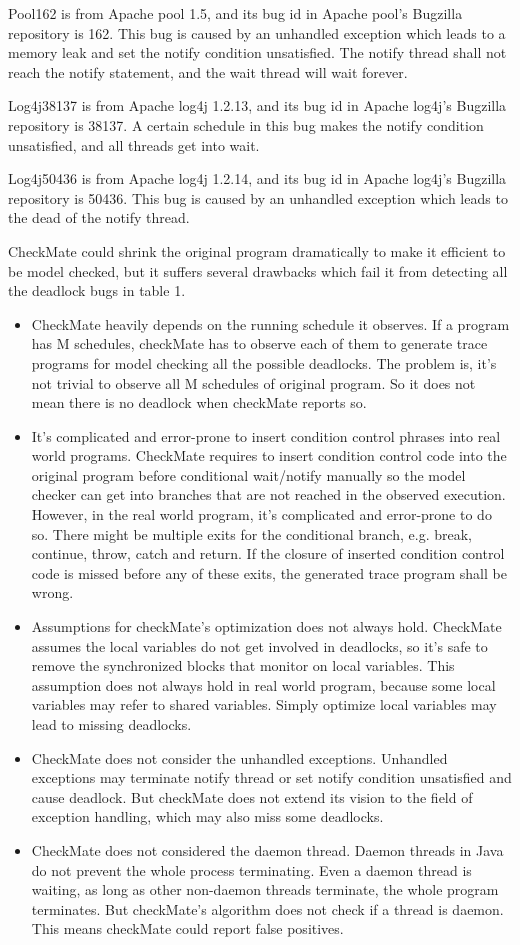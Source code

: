 \documentclass{sigplanconf}
\begin{document}
Pool162 is from Apache pool 1.5, and its bug id in Apache pool’s Bugzilla repository is 162. This bug is caused by an unhandled exception which leads to a memory leak and set the notify condition unsatisfied. The notify thread shall not reach the notify statement, and the wait thread will wait forever.

Log4j38137 is from Apache log4j 1.2.13, and its bug id in Apache log4j’s Bugzilla repository is 38137. A certain schedule in this bug makes the notify condition unsatisfied, and all threads get into wait.

Log4j50436 is from Apache log4j 1.2.14, and its bug id in Apache log4j’s Bugzilla repository is 50436. This bug is caused by an unhandled exception which leads to the dead of the notify thread.

CheckMate could shrink the original program dramatically to make it efficient to be model checked, but it suffers several drawbacks which fail it from detecting all the deadlock bugs in table 1.
\begin{itemize}
  \item CheckMate heavily depends on the running schedule it observes. If a program has M schedules, checkMate has to observe each of them to generate trace programs for model checking all the possible deadlocks. The problem is, it’s not trivial to observe all M schedules of original program. So it does not mean there is no deadlock when checkMate reports so.
  \item It’s complicated and error-prone to insert condition control phrases into real world programs. CheckMate requires to insert condition control code into the original program before conditional wait/notify manually so the model checker can get into branches that are not reached in the observed execution. However, in the real world program, it’s complicated and error-prone to do so. There might be multiple exits for the conditional branch, e.g. break, continue, throw, catch and return. If the closure of inserted condition control code is missed before any of these exits, the generated trace program shall be wrong.
  \item Assumptions for checkMate’s optimization does not always hold. CheckMate assumes the local variables do not get involved in deadlocks, so it’s safe to remove the synchronized blocks that monitor on local variables. This assumption does not always hold in real world program, because some local variables may refer to shared variables. Simply optimize local variables may lead to missing deadlocks.
  \item CheckMate does not consider the unhandled exceptions. Unhandled exceptions may terminate notify thread or set notify condition unsatisfied and cause deadlock. But checkMate does not extend its vision to the field of exception handling, which may also miss some deadlocks.
  \item CheckMate does not considered the daemon thread. Daemon threads in Java do not prevent the whole process terminating. Even a daemon thread is waiting, as long as other non-daemon threads terminate, the whole program terminates. But checkMate’s algorithm does not check if a thread is daemon. This means checkMate could report false positives.
\end{itemize}
\end{document}
